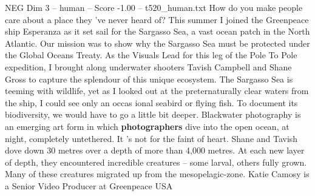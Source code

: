 \begin{textsample}{NEG Dim 3 – human – Score -1.00 – t520\_human.txt}  \label{ex:f3_neg_043}
How do you make people care about a place they ’ve never heard of?
This summer I joined the Greenpeace ship Esperanza as it set sail for the Sargasso Sea, a vast ocean patch in the North Atlantic.
Our mission was to show why the Sargasso Sea must be protected under the Global Oceans Treaty.
As the Visuals Lead for this leg of the Pole To Pole expedition, I brought along underwater shooters Tavish Campbell and Shane Gross to capture the splendour of this unique ecosystem.
The Sargasso Sea is teeming with wildlife, yet as I looked out at the preternaturally clear waters from the ship, I could see only an occas ional seabird or flying fish.
To document its biodiversity, we would have to go a little bit deeper.
Blackwater photography is an emerging art form in which \textbf{photographers} dive into the open ocean, at night, completely untethered.
It ’s not for the faint of heart.
Shane and Tavish dove down 30 metres over a depth of more than 4,000 metres.
At each new layer of depth, they encountered incredible creatures – some larval, others fully grown.
Many of these creatures migrated up from the mesopelagic-zone.
Katie Camosy is a Senior Video Producer at Greenpeace USA

\end{textsample}
